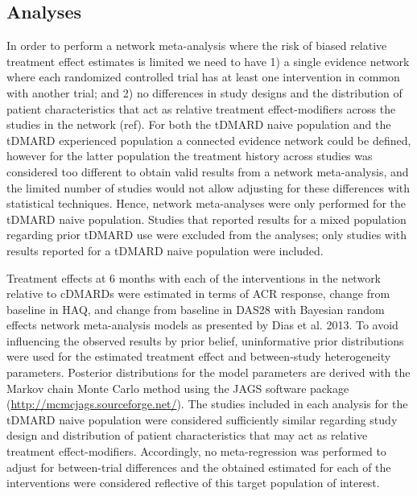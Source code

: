 \documentclass[11pt,final,fleqn]{article}
\theoremstyle{plain}
\begin{document}
\begin{appendices}
\subsection{Analyses}\label{app:nma-analyses}
In order to perform a network meta-analysis where the risk of biased relative treatment effect estimates is limited we need to have 1) a single evidence network where each randomized controlled trial has at least one intervention in common with another trial; and 2) no differences in study designs and the distribution of patient characteristics that act as relative treatment effect-modifiers across the studies in the network (ref). For both the tDMARD naive population and the tDMARD experienced population a connected evidence network could be defined, however for the latter population the treatment history across studies was considered too different to obtain valid results from a network meta-analysis, and the limited number of studies would not allow adjusting for these differences with statistical techniques. Hence, network meta-analyses were only performed for the tDMARD naive population. Studies that reported results for a mixed population regarding prior tDMARD use were excluded from the analyses; only studies with results reported for a tDMARD naive population were included. 

Treatment effects at 6 months with each of the interventions in the network relative to cDMARDs were estimated in terms of ACR response, change from baseline in HAQ, and change from baseline in DAS28 with Bayesian random effects network meta-analysis models as presented by Dias et al. 2013. To avoid influencing the observed results by prior belief, uninformative prior distributions were used for the estimated treatment effect and between-study heterogeneity parameters. Posterior distributions for the model parameters are derived with the Markov chain Monte Carlo method using the JAGS software package (\url{http://mcmcjags.sourceforge.net/}). The studies included in each analysis for the tDMARD naive population were considered sufficiently similar regarding study design and distribution of patient characteristics that may act as relative treatment effect-modifiers. Accordingly, no meta-regression was performed to adjust for between-trial differences and the obtained estimated for each of the interventions were considered reflective of this target population of interest. 


\end{appendices}
\end{document}
